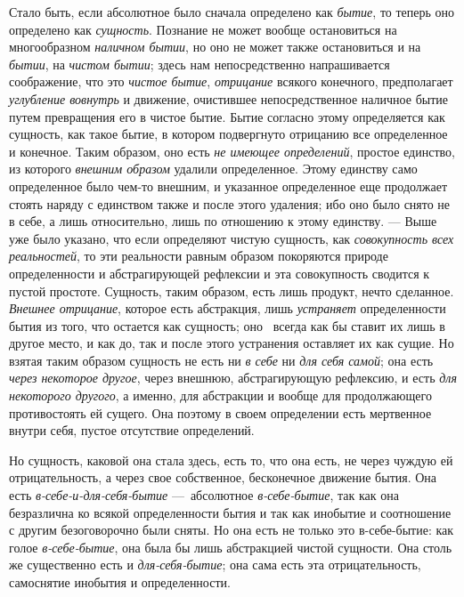 Стало быть, если абсолютное было сначала определено как
{\em бытие}, то теперь оно определено как
{\em сущность}. Познание не может вообще остановиться
на многообразном {\em наличном бытии}, но оно не может
также остановиться и на {\em бытии}, на
{\em чистом бытии}; здесь нам непосредственно
напрашивается соображение, что это {\em чистое бытие},
{\em отрицание} всякого конечного, предполагает
{\em углубление вовнутрь} и движение, очистившее
непосредственное наличное бытие путем превращения его в чистое бытие. Бытие
согласно этому определяется как сущность, как такое бытие, в котором
подвергнуто отрицанию все определенное и конечное. Таким образом, оно есть
{\em не имеющее определений}, простое единство, из
которого {\em внешним образом} удалили определенное.
Этому единству само определенное было чем-то внешним, и указанное
определенное еще продолжает стоять наряду с единством также и после этого
удаления; ибо оно было снято не в себе, а лишь относительно, лишь по
отношению к этому единству. —
Выше~
уже было указано, что если определяют чистую сущность, как
{\em совокупность всех реальностей}, то эти реальности
равным образом покоряются природе определенности и абстрагирующей рефлексии
и эта совокупность сводится к пустой простоте. Сущность, таким образом,
есть лишь продукт, нечто сделанное. {\em Внешнее
отрицание}, которое есть абстракция, лишь
{\em устраняет} определенности бытия из того, что
остается как сущность;
оно~
всегда как бы ставит их лишь в другое место, и как до, так и после этого
устранения оставляет их как сущие. Но взятая таким образом сущность не есть
ни {\em в себе} ни {\em для себя
самой}; она есть {\em через некоторое другое}, через
внешнюю, абстрагирующую рефлексию, и есть {\em для
некоторого другого}, а именно, для абстракции и вообще для продолжающего
противостоять ей сущего. Она поэтому в своем определении есть мертвенное
внутри себя, пустое отсутствие определений.

Но сущность, каковой она стала здесь, есть то, что она есть, не через чуждую
ей отрицательность, а через свое собственное, бесконечное движение бытия.
Она есть {\em в-себе-и-для-себя-бытие} —~абсолютное
{\em в-себе-бытие}, так как она безразлична ко всякой
определенности бытия и так как инобытие и соотношение с другим
безоговорочно были сняты. Но она есть не только это в-себе-бытие: как голое
{\em в-себе-бытие}, она была бы лишь абстракцией чистой
сущности. Она столь же существенно есть и
{\em для-себя-бытие}; она сама есть эта
отрицательность, самоснятие инобытия и определенности.

